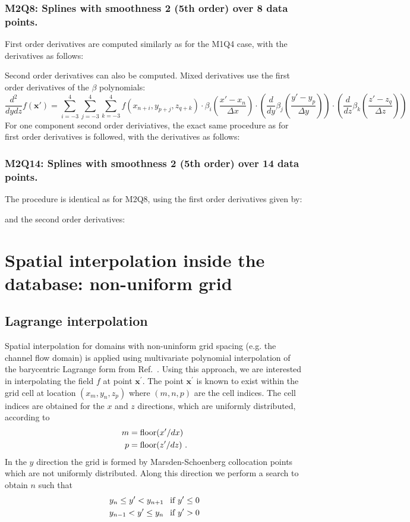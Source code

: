 \documentclass[11pt]{article}
\begin{document}
\subsubsection*{M2Q8: Splines with smoothness 2 (5th order) over 8 data points.}
First order derivatives are computed similarly as for the M1Q4 case, with the derivatives as follows:

Second order derivatives can also be computed.
Mixed derivatives use the first order derivatives of the $\beta$ polynomials:
\begin{equation}
    \frac{d^2}{dydz} f(\mathbf{x}') =
    \sum_{i=-3}^4 \sum_{j=-3}^4 \sum_{k=-3}^4
    f(x_{n+i}, y_{p+j}, z_{q+k})
    \cdot \beta_i\left(\frac{x' - x_n}{\Delta x}\right)
    \cdot \left(\frac{d}{dy} \beta_j\left(\frac{y' - y_p}{\Delta y}\right)\right)
    \cdot \left(\frac{d}{dz} \beta_k\left(\frac{z' - z_q}{\Delta z}\right)\right)
\end{equation}
For one component second order deriviatives, the exact same procedure as for first order derivatives is
followed, with the derivatives as follows:

\subsubsection*{M2Q14: Splines with smoothness 2 (5th order) over 14 data points.}
The procedure is identical as for M2Q8, using the first order derivatives given by:

and the second order derivatives:


\section{Spatial interpolation inside the database: non-uniform grid}\label{sec:interp}
\subsection{Lagrange interpolation}
Spatial interpolation for domains with non-uninform grid spacing (e.g. the
channel flow domain) is applied using multivariate polynomial interpolation of
the barycentric Lagrange form from Ref.~\cite{Berrut2004}. Using this approach,
we are interested in interpolating the field $f$ at point $\bm{x}^\prime$. The
point $\bm{x}^\prime$ is known to exist within the grid cell at location
$(x_m,y_n,z_p)$ where $(m,n,p)$ are the cell indices. The cell indices are
obtained for the $x$ and $z$ directions, which are uniformly distributed,
according to
\begin{align}
  m &= \text{floor}( x^\prime / dx ) \\
  p &= \text{floor}( z^\prime / dz ) \mbox{ .} \notag
\end{align}
In the $y$ direction the grid is formed by Marsden-Schoenberg collocation points
which are not uniformly distributed. Along this direction we perform a search to obtain $n$ such that 
\begin{align}
  y_n  \leq y^\prime < y_{n+1} &\text{\hspace{1ex} if } y^\prime \leq 0 \\
  y_{n-1} < y^\prime \leq y_n &\text{\hspace{1ex} if } y^\prime > 0 \notag
\end{align}
\end{document}
